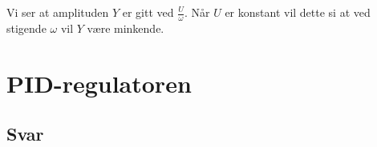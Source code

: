 \documentclass[answers,11pt]{exam}
\begin{document}
\begin{enumerate}[label=\alph*)]
\begin{tcolorbox}
\begin{enumerate}[label=p\arabic*)]
            Vi ser at amplituden $Y$ er gitt ved $\frac{U}{\omega}$. Når $U$ er konstant vil dette si at ved 
            stigende $\omega$ vil $Y$ være minkende.

    \end{enumerate}

  \end{tcolorbox}

  \newpage
  \section*{PID-regulatoren}

  

  \begin{tcolorbox}
    \subsection*{Svar}


\end{tcolorbox}
\end{enumerate}
\end{document}
